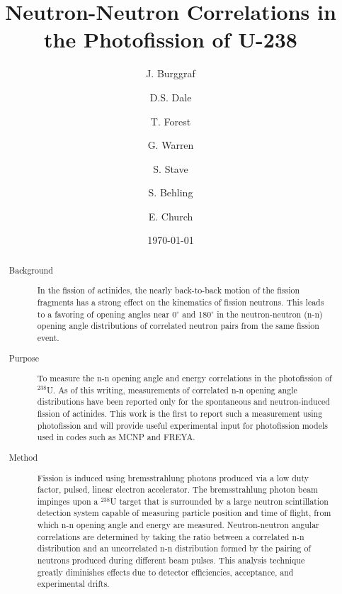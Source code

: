 \documentclass[%
 reprint,
 calc,
 amsmath,amssymb,
 aps,
 nofootinbib,
 linenumbers
]{revtex4-1}
\begin{document}

\title{Neutron-Neutron Correlations in the Photofission of U-238
}


\author{J. Burggraf}
\author{D.S. Dale}
\author{T. Forest}

\author{G. Warren}
\author{S. Stave}
\author{S. Behling}
\author{E. Church}

\date{\today}
\begin{abstract}
    \begin{description}
        \item[Background] In the fission of actinides, the nearly back-to-back motion of the fission fragments has a strong effect on the kinematics of fission neutrons.
        This leads to a favoring of opening angles near 0$^{\circ}$ and 180$^{\circ}$ in the neutron-neutron (n-n) opening angle distributions of correlated neutron pairs from the same fission event.
        
        \item[Purpose] To measure the n-n opening angle and energy correlations in the photofission of $^{238}$U.
        As of this writing, measurements of correlated n-n opening angle distributions have been reported only for the spontaneous and neutron-induced fission of actinides.
        This work is the first to report such a measurement using photofission and will provide useful experimental input for photofission models used in codes such as MCNP and FREYA.

        \item[Method] Fission is induced using bremsstrahlung photons produced via a low duty factor, pulsed, linear electron accelerator.
        The bremsstrahlung photon beam impinges upon a $^{238}$U target that is surrounded by a large neutron scintillation detection system capable of measuring particle position and time of flight, from which n-n opening angle and energy are measured.
Neutron-neutron angular correlations are determined by taking the ratio between a correlated n-n distribution and an uncorrelated n-n distribution formed by the pairing of neutrons produced during different beam pulses.
        This analysis technique greatly diminishes effects due to detector efficiencies, acceptance, and experimental drifts.


\end{description}
\end{abstract}
\end{document}

